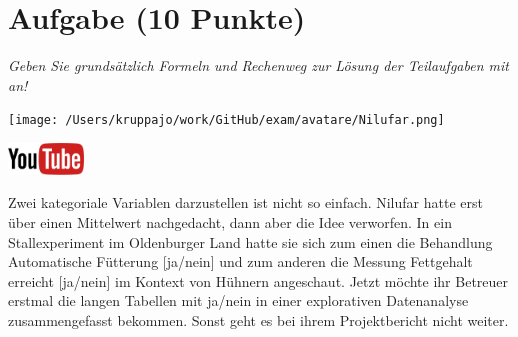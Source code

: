 \documentclass[a4paper, 9pt]{scrartcl}\usepackage[]{graphicx}\usepackage[]{xcolor}
\begin{document}
\section{Aufgabe \hfill (10 Punkte)}

\textit{Geben Sie grundsätzlich Formeln und Rechenweg zur Lösung der Teilaufgaben mit an!} \\[1Ex]
 

 
\begin{minipage}[t]{0.5\textwidth}
\texttt{[image: /Users/kruppajo/work/GitHub/exam/avatare/Nilufar.png]}
\end{minipage}
\begin{minipage}[t]{0.5\textwidth}
\hfill
\href{https://youtu.be/t_1KL77mfmg}{\includegraphics[width = 2cm]{img/youtube}}\\[1Ex]
\end{minipage}
\vspace{1ex}



Zwei kategoriale Variablen darzustellen ist nicht so einfach. Nilufar hatte erst über einen Mittelwert nachgedacht, dann aber die Idee verworfen. In ein Stallexperiment im Oldenburger Land hatte sie sich zum einen die Behandlung Automatische Fütterung [ja/nein] und zum anderen die Messung Fettgehalt erreicht [ja/nein] im Kontext von Hühnern angeschaut. Jetzt möchte ihr Betreuer erstmal die langen Tabellen mit ja/nein in einer explorativen Datenanalyse zusammengefasst bekommen. Sonst geht es bei ihrem Projektbericht nicht weiter.



\vspace{1Ex}
\end{document}
